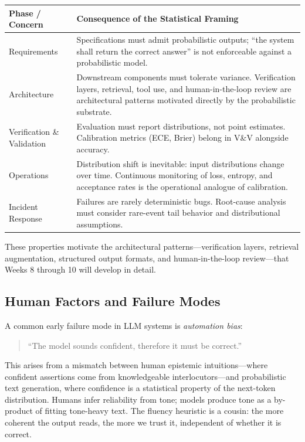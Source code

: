 \begin{center}
\begin{tabular}{|L{3.4cm}|L{8.0cm}|}
\hline
\textbf{Phase / Concern} & \textbf{Consequence of the Statistical Framing} \\
\hline
Requirements & Specifications must admit probabilistic outputs; ``the system shall return the correct answer'' is not enforceable against a probabilistic model. \\
\hline
Architecture & Downstream components must tolerate variance. Verification layers, retrieval, tool use, and human-in-the-loop review are architectural patterns motivated directly by the probabilistic substrate. \\
\hline
Verification \& Validation & Evaluation must report distributions, not point estimates. Calibration metrics (ECE, Brier) belong in V\&V alongside accuracy. \\
\hline
Operations & Distribution shift is inevitable: input distributions change over time. Continuous monitoring of loss, entropy, and acceptance rates is the operational analogue of calibration. \\
\hline
Incident Response & Failures are rarely deterministic bugs. Root-cause analysis must consider rare-event tail behavior and distributional assumptions. \\
\hline
\end{tabular}
\end{center}

These properties motivate the architectural patterns---verification layers, retrieval augmentation, structured output formats, and human-in-the-loop review---that Weeks 8 through 10 will develop in detail.

\subsection{Human Factors and Failure Modes}

A common early failure mode in LLM systems is \emph{automation bias}:
\begin{quote}
``The model sounds confident, therefore it must be correct.''
\end{quote}
This arises from a mismatch between human epistemic intuitions---where confident assertions come from knowledgeable interlocutors---and probabilistic text generation, where confidence is a statistical property of the next-token distribution. Humans infer reliability from tone; models produce tone as a by-product of fitting tone-heavy text. The fluency heuristic is a cousin: the more coherent the output reads, the more we trust it, independent of whether it is correct.

